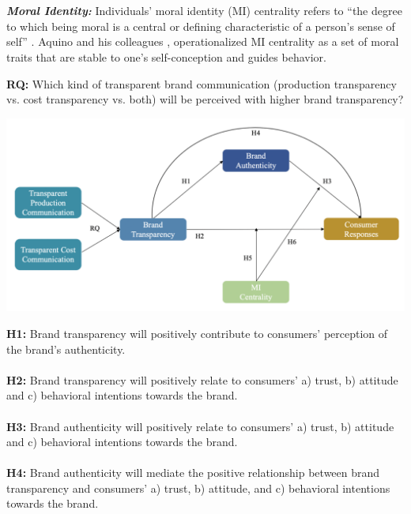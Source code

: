 \documentclass[a0,portrait]{a0poster}
\begin{document}
\begin{minipage}[c]{\linewidth}
\begin{framed}
\begin{multicols}{2}
\\ 
\\
    \color{Maroon} \textbf{\emph{Moral Identity:}} \color{Black}Individuals’ moral identity (MI) centrality refers to “the degree to which being moral is a central or defining characteristic of a person’s sense of self” \autocite{blasi_moral_1994}.
    Aquino and his colleagues \autocite{aquino_self-importance_2002}\autocite{aquino_testing_2009}, operationalized MI centrality as a set of moral traits that are stable to one’s self-conception and guides behavior. 
    \\
   \begin{center}
  \color{Maroon} \textbf{RQ:} \color{Black}  Which kind of transparent brand communication (production transparency vs. cost transparency vs. both) will be perceived with higher brand transparency? \\
  \end{center}
\begin{center}
\includegraphics[width=0.7\linewidth]{figures/Figure1}
\label{ALICerros}
\end{center}
\color{Maroon}
\textbf{H1:} \color{Black}Brand transparency will positively contribute to consumers' perception of the brand's authenticity. \\
\\
\color{Maroon}
\textbf{H2:} \color{Black} Brand transparency will positively relate to consumers’ a) trust, b) attitude and c) behavioral intentions towards the brand.\\
\\
\color{Maroon}
\textbf{H3:} \color{Black} Brand authenticity will positively relate to consumers’ a) trust, b) attitude and c) behavioral intentions towards the brand.\\
\\
\color{Maroon}
\textbf{H4:} \color{Black} Brand authenticity will mediate the positive relationship between brand transparency and consumers’ a) trust, b) attitude, and c) behavioral intentions towards the brand.\\

\end{multicols}
\end{framed}
\end{minipage}
\end{document}
